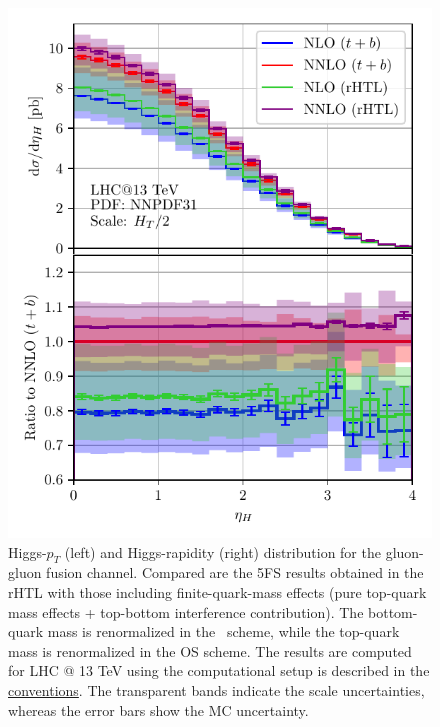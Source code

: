\begin{figure}[h]
\begin{minipage}[t]{0.49\textwidth}
  \includegraphics[width=\textwidth]{Images/yH_13000_bMS_tOS_cropped.pdf}
\end{minipage}
\caption{Higgs-$p_T$ (left) and Higgs-rapidity (right) distribution for the gluon-gluon fusion channel. Compared are the 5\acs{FS} results obtained in the \acs{rHTL} with those including finite-quark-mass effects (pure top-quark mass effects + top-bottom interference contribution). The bottom-quark mass is renormalized in the \MS\ scheme, while the top-quark mass is renormalized in the \acs{OS} scheme. The results are computed for LHC @ 13 TeV using the computational setup is described in the \hyperref[chap:notation_and_conventions]{conventions}. The transparent bands indicate the scale uncertainties, whereas the error bars show the \acs{MC} uncertainty.}
\label{fig:6:pT_yH_distributions}
\end{figure}

